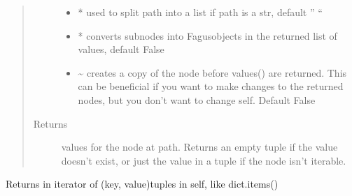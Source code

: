 \documentclass[a4paper,10pt,english]{sphinxmanual}
\begin{document}
\begin{fulllineitems}
\begin{fulllineitems}
\begin{quote}
\begin{description}
\begin{itemize}
\item {}
\sphinxAtStartPar
{} \textendash{} * used to split path into a list if path is a str, default ” “

\item {}
\sphinxAtStartPar
{} \textendash{} * converts sub\sphinxhyphen{}nodes into Fagus\sphinxhyphen{}objects in the returned list of values, default False

\item {}
\sphinxAtStartPar
{} \textendash{} \textasciitilde{} creates a copy of the node before values() are returned. This can be beneficial if you want to make
changes to the returned nodes, but you don’t want to change self. Default False

\end{itemize}

\item[{Returns}] \leavevmode
\sphinxAtStartPar
values for the node at path. Returns an empty tuple if the value doesn’t exist, or just the value in a
tuple if the node isn’t iterable.

\end{description}\end{quote}

\end{fulllineitems}


\begin{fulllineitems}
\label{\detokenize{fagus.fagus:fagus.fagus.Fagus.items}}
\pysigstartsignatures
{}
\pysigstopsignatures
\sphinxAtStartPar
Returns in iterator of (key, value)\sphinxhyphen{}tuples in self, like dict.items()


\end{fulllineitems}
\end{fulllineitems}
\end{document}
